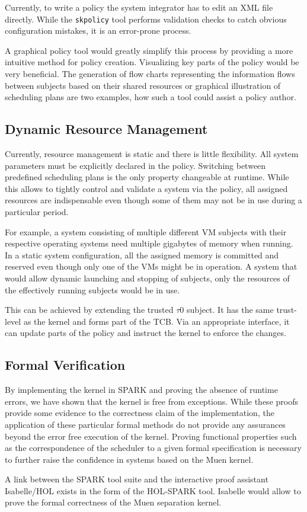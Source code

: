 Currently, to write a policy the system integrator has to edit an XML file
directly. While the \texttt{skpolicy} tool performs validation checks to catch
obvious configuration mistakes, it is an error-prone process.

A graphical policy tool would greatly simplify this process by providing a more
intuitive method for policy creation. Visualizing key parts of the policy would
be very beneficial. The generation of flow charts representing the information
flows between subjects based on their shared resources or graphical illustration
of scheduling plans are two examples, how such a tool could assist a policy
author.

\subsection{Dynamic Resource Management}
Currently, resource management is static and there is little flexibility. All
system parameters must be explicitly declared in the policy. Switching between
predefined scheduling plans is the only property changeable at runtime. While
this allows to tightly control and validate a system via the policy, all
assigned resources are indispensable even though some of them may not be in use
during a particular period.

For example, a system consisting of multiple different VM subjects with their
respective operating systems need multiple gigabytes of memory when running.
In a static system configuration, all the assigned memory is committed and
reserved even though only one of the VMs might be in operation. A system that
would allow dynamic launching and stopping of subjects, only the resources of
the effectively running subjects would be in use.

This can be achieved by extending the trusted $\tau$0 subject. It has the same
trust-level as the kernel and forms part of the TCB. Via an appropriate
interface, it can update parts of the policy and instruct the kernel to enforce
the changes.

\subsection{Formal Verification}
By implementing the kernel in SPARK and proving the absence of runtime errors,
we have shown that the kernel is free from exceptions. While these proofs
provide some evidence to the correctness claim of the implementation, the
application of these particular formal methods do not provide any assurances
beyond the error free execution of the kernel. Proving functional properties
such as the correspondence of the scheduler to a given formal specification is
necessary to further raise the confidence in systems based on the Muen kernel.

A link between the SPARK tool suite and the interactive proof assistant
Isabelle/HOL exists in the form of the HOL-SPARK tool. Isabelle would allow to
prove the formal correctness of the Muen separation kernel.
